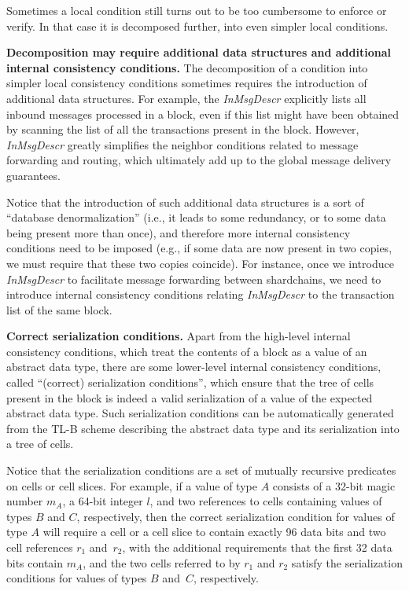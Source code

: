 \documentclass[12pt,oneside]{article}
\def\makepoint#1{\medbreak\noindent{\bf #1.\ }}
\def\nxsubpoint{\refstepcounter{subsubsection}%
  \smallbreak\makepoint{\thesubsubsection}}
\def\emb#1{\textbf{#1.}}
\begin{document}
Sometimes a local condition still turns out to be too cumbersome to enforce or verify. In that case it is decomposed further, into even simpler local conditions.

\nxsubpoint\emb{Decomposition may require additional data structures and additional internal consistency conditions}
The decomposition of a condition into simpler local consistency conditions sometimes requires the introduction of additional data structures. For example, the {\em InMsgDescr\/} explicitly lists all inbound messages processed in a block, even if this list might have been obtained by scanning the list of all the transactions present in the block. However, {\em InMsgDescr\/} greatly simplifies the neighbor conditions related to message forwarding and routing, which ultimately add up to the global message delivery guarantees.

Notice that the introduction of such additional data structures is a sort of ``database denormalization'' (i.e., it leads to some redundancy, or to some data being present more than once), and therefore more internal consistency conditions need to be imposed (e.g., if some data are now present in two copies, we must require that these two copies coincide). For instance, once we introduce {\em InMsgDescr\/} to facilitate message forwarding between shardchains, we need to introduce internal consistency conditions relating {\em InMsgDescr\/} to the transaction list of the same block.

\nxsubpoint\emb{Correct serialization conditions}
Apart from the high-level internal consistency conditions, which treat the contents of a block as a value of an abstract data type, there are some lower-level internal consistency conditions, called ``(correct) serialization conditions'', which ensure that the tree of cells present in the block is indeed a valid serialization of a value of the expected abstract data type. Such serialization conditions can be automatically generated from the TL-B scheme describing the abstract data type and its serialization into a tree of cells.

Notice that the serialization conditions are a set of mutually recursive predicates on cells or cell slices. For example, if a value of type $A$ consists of a 32-bit magic number $m_A$, a 64-bit integer $l$, and two references to cells containing values of types $B$ and $C$, respectively, then the correct serialization condition for values of type $A$ will require a cell or a cell slice to contain exactly 96 data bits and two cell references $r_1$ and~$r_2$, with the additional requirements that the first 32 data bits contain $m_A$, and the two cells referred to by $r_1$ and $r_2$ satisfy the serialization conditions for values of types $B$ and~$C$, respectively.
\end{document}
